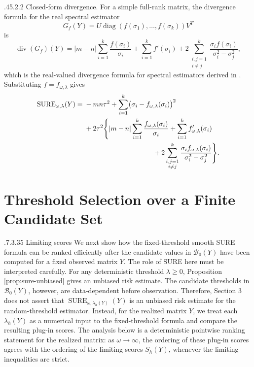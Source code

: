 \documentclass[12pt,reqno]{amsart}
\makeatletter
\numberwithin{equation}{section}
\def\subsection{\@startsection{subsection}{2}{\z@}%
  {.7\linespacing\@plus.3\linespacing}{.35\linespacing}%
  {\normalfont\bfseries\def\@secnumfont{\bfseries}}}
\def\paragraph{\@startsection{paragraph}{4}{\z@}%
  {.45\linespacing\@plus.2\linespacing}{.2\linespacing}%
  {\normalfont\bfseries}}
\theoremstyle{plain}
\theoremstyle{definition}
\newcommand{\diagop}{\operatorname{diag}}
\newcommand{\divop}{\operatorname{div}}
\makeatother
\begin{document}
\paragraph{Closed-form divergence.}
For a simple full-rank matrix, the divergence formula for the real spectral estimator
\[
    G_f(Y)=U\diagop(f(\sigma_1),\ldots,f(\sigma_k))V^T
\]
is
\begin{equation}\label{eq:divergence}
    \divop(G_f)(Y)
    =|m-n|\sum_{i=1}^{k}\frac{f(\sigma_i)}{\sigma_i}
    +\sum_{i=1}^{k}f'(\sigma_i)
    +2\sum_{\substack{i,j=1\\i\neq j}}^{k}
        \frac{\sigma_i f(\sigma_i)}{\sigma_i^2-\sigma_j^2},
\end{equation}
which is the real-valued divergence formula for spectral estimators derived in \cite{candes2013unbiased}. Substituting $f=f_{\omega,\lambda}$ gives
\begin{equation}\label{eq:smooth-sure}
\begin{aligned}
    \operatorname{SURE}_{\omega,\lambda}(Y)
    ={}&-mn\tau^2+
    \sum_{i=1}^{k}\bigl(\sigma_i-f_{\omega,\lambda}(\sigma_i)\bigr)^2 \\
    &+2\tau^2\Biggl\{
    |m-n|\sum_{i=1}^{k}\frac{f_{\omega,\lambda}(\sigma_i)}{\sigma_i}
    +\sum_{i=1}^{k}f'_{\omega,\lambda}(\sigma_i) \\
    &\hspace{3.5cm}
    +2\sum_{\substack{i,j=1\\i\neq j}}^{k}
        \frac{\sigma_i f_{\omega,\lambda}(\sigma_i)}{\sigma_i^2-\sigma_j^2}
    \Biggr\}.
\end{aligned}
\end{equation}

\section{Threshold Selection over a Finite Candidate Set}

\subsection{Limiting scores}
We next show how the fixed-threshold smooth SURE formula can be ranked efficiently after the candidate values in $\mathcal B_0(Y)$ have been computed for a fixed observed matrix $Y$. The role of SURE here must be interpreted carefully. For any deterministic threshold $\lambda\geq0$, Proposition \ref{prop:sure-unbiased} gives an unbiased risk estimate. The candidate thresholds in $\mathcal B_0(Y)$, however, are data-dependent before observation. Therefore, Section 3 does not assert that $\operatorname{SURE}_{\omega,\lambda_h(Y)}(Y)$ is an unbiased risk estimate for the random-threshold estimator. Instead, for the realized matrix $Y$, we treat each $\lambda_h(Y)$ as a numerical input to the fixed-threshold formula and compare the resulting plug-in scores. The analysis below is a deterministic pointwise ranking statement for the realized matrix: as $\omega\to\infty$, the ordering of these plug-in scores agrees with the ordering of the limiting scores $S_h(Y)$, whenever the limiting inequalities are strict.
\end{document}

